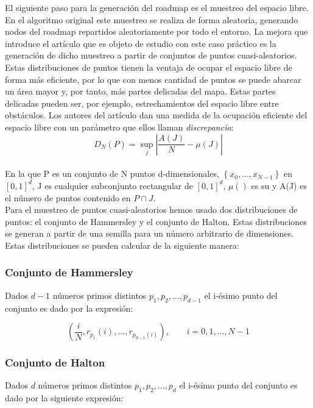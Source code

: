 El siguiente paso para la generación del roadmap es el muestreo del espacio libre. En el algoritmo original este muestreo se realiza de forma aleatoria, generando nodos del roadmap repartidos aleatoriamente por todo el entorno. La mejora que introduce el artículo que es objeto de estudio con este caso práctico es la generación de dicho muestreo a partir de conjuntos de puntos cuasi-aleatorios. Estas distribuciones de puntos tienen la ventaja de ocupar el espacio libre de forma más eficiente, por lo que con menos cantidad de puntos se puede abarcar un área mayor y, por tanto, más partes delicadas del mapa. Estas partes delicadas pueden ser, por ejemplo, estrechamientos del espacio libre entre obstáculos. Los autores del artículo dan una medida de la ocupación eficiente del espacio libre con un parámetro que ellos llaman \textit{discrepancia}:\\




 \[ D_N(P) = \sup_{j}{\left| \frac{A(J)}{N} -  \mu(J) \right| }\]\\

En la que P es un conjunto de N puntos d-dimensionales, $\left\lbrace x_0, ... , x_{N-1} \right\rbrace$ en $[0,1]^d$, J es cualquier subconjunto rectangular de $[0,1]^d$, $\mu()$ es su  y A(J) es el número de puntos contenido en $P \cap J$.\\

Para el muestreo de puntos cuasi-aleatorios hemos usado dos distribuciones de puntos: el conjunto de Hammersley y el conjunto de Halton. Estas distribuciones se generan a partir de una semilla para un número arbitrario de dimensiones. Estas distribuciones se pueden calcular de la siguiente manera:

\subsubsection{Conjunto de Hammersley}

Dados $d-1$ números primos distintos $p_1, p_2, ... , p_{d-1}$ el i-ésimo punto del conjunto es dado por la expresión:

\[ \left( \frac{i}{N}, r_{p_1}(i), ..., r_{p_{d-1}(i)} \right), \qquad i = 0, 1, ..., N-1\]

\subsubsection{Conjunto de Halton}

Dados $d$ números primos distintos $p_1, p_2, ..., p_d$ el i-ésimo punto del conjunto es dado por la siguiente expresión:

